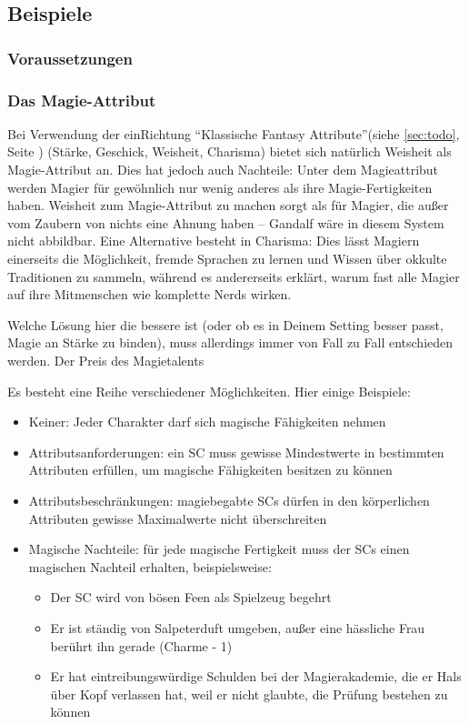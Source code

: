 \subsection{Beispiele}
\subsubsection{Voraussetzungen}

 
\subsubsection{Das Magie-Attribut}

Bei Verwendung der einRichtung "`Klassische Fantasy Attribute"'(siehe \ref {sec:todo}, Seite \pageref {sec:todo}) (Stärke, Geschick, Weisheit, Charisma) bietet sich natürlich Weisheit als Magie-Attribut an. Dies hat jedoch auch Nachteile: Unter dem Magieattribut werden Magier für gewöhnlich nur wenig anderes als ihre Magie-Fertigkeiten haben. Weisheit zum Magie-Attribut zu machen sorgt als für Magier, die außer vom Zaubern von nichts eine Ahnung haben -- Gandalf wäre in diesem System nicht abbildbar.
Eine Alternative besteht in Charisma: Dies lässt Magiern einerseits die Möglichkeit, fremde Sprachen zu lernen und Wissen über okkulte Traditionen zu sammeln, während es andererseits erklärt, warum fast alle Magier auf ihre Mitmenschen wie komplette Nerds wirken.

Welche Lösung hier die bessere ist (oder ob es in Deinem Setting besser passt, Magie an Stärke zu binden), muss allerdings immer von Fall zu Fall entschieden werden.
Der Preis des Magietalents

Es besteht eine Reihe verschiedener Möglichkeiten. Hier einige Beispiele:
\begin{itemize}
\item Keiner: Jeder Charakter darf sich magische Fähigkeiten nehmen
\item Attributsanforderungen: ein SC muss gewisse Mindestwerte in bestimmten Attributen erfüllen, um magische Fähigkeiten besitzen zu können
\item Attributsbeschränkungen: magiebegabte SCs dürfen in den körperlichen Attributen gewisse Maximalwerte nicht überschreiten
\item Magische Nachteile: für jede magische Fertigkeit muss der SCs einen magischen Nachteil erhalten, beispielsweise:
\begin{itemize} 
\item Der SC wird von bösen Feen als Spielzeug begehrt
\item Er ist ständig von Salpeterduft umgeben, außer eine hässliche Frau berührt ihn gerade (Charme - 1)
\item Er hat eintreibungswürdige Schulden bei der Magierakademie, die er Hals über Kopf verlassen hat, weil er nicht glaubte, die Prüfung bestehen zu können
\end{itemize}
\end{itemize}

